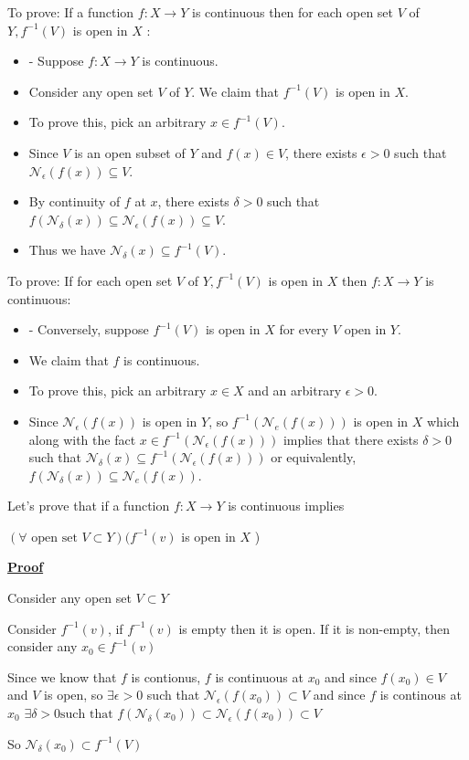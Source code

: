 \documentclass[12pt,a4paper]{article}
\begin{document}
To prove: If a function \(f: X \rightarrow Y\) is continuous then for each open set \(V\) of \(Y, f^{-1}(V)\) is open in \(X\) :
\begin{itemize}
    \item - Suppose \(f: X \rightarrow Y\) is continuous.
    \item Consider any open set \(V\) of \(Y\). We claim that \(f^{-1}(V)\) is open in \(X\).
    \item To prove this, pick an arbitrary \(x \in f^{-1}(V)\).
    \item Since \(V\) is an open subset of \(Y\) and \(f(x) \in V\), there exists \(\epsilon>0\) such that \(\mathcal{N}_\epsilon(f(x)) \subseteq V\).
    \item By continuity of \(f\) at \(x\), there exists \(\delta>0\) such that \(f\left(\mathcal{N}_\delta(x)\right) \subseteq \mathcal{N}_\epsilon(f(x)) \subseteq V\).
    \item Thus we have \(\mathcal{N}_\delta(x) \subseteq f^{-1}(V)\).
\end{itemize}

To prove: If for each open set \(V\) of \(Y, f^{-1}(V)\) is open in \(X\) then \(f: X \rightarrow Y\) is continuous:
\begin{itemize}
    \item - Conversely, suppose \(f^{-1}(V)\) is open in \(X\) for every \(V\) open in \(Y\).
    \item We claim that \(f\) is continuous.
    \item To prove this, pick an arbitrary \(x \in X\) and an arbitrary \(\epsilon>0\).
    \item Since \(\mathcal{N}_\epsilon(f(x))\) is open in \(Y\), so \(f^{-1}\left(\mathcal{N}_e(f(x))\right)\) is open in \(X\) which along with the fact \(x \in f^{-1}\left(\mathcal{N}_\epsilon(f(x))\right)\) implies that there exists \(\delta>0\) such that \(\mathcal{N}_\delta(x) \subseteq f^{-1}\left(\mathcal{N}_\epsilon(f(x))\right)\) or equivalently, \(f\left(\mathcal{N}_\delta(x)\right) \subseteq \mathcal{N}_e(f(x))\).
\end{itemize}

Let's prove that if a function \(f: X \to Y\) is continuous implies 

\((\forall \text{ open set } V \subset Y)(f^{-1}(v)\) is open in \(X\)  )

\underline{\textbf{Proof}}

Consider any open set \(V \subset Y\)

Consider \(f^{-1}(v)\), if \(f^{-1}(v)\) is empty then it is open. If it is non-empty, then consider any \(x_{0} \in f^{-1}(v)\) 

Since we know that \(f\) is contionus, \(f\) is continuous at \(x_{0}\) and since \(f(x_{0}) \in V\) and \(V\) is open, so \(\exists \epsilon > 0 \) such that \(\mathcal{N} _{\epsilon}(f(x_{0}))\subset V\) and since \(f\) is continous at \(x_{0}\) \(\exists \delta > 0 \text{such that } f(\mathcal{N}_{\delta}(x_{0}))\subset \mathcal{N}_{\epsilon}(f(x_{0})) \subset V\)

So \(\mathcal{N}_{\delta}(x_{0}) \subset f^{-1}(V)\)  
\end{document}
